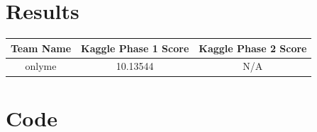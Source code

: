 \section{Results}

\begin{center}
 \begin{tabular}{|c | c | c |} 
 \hline
 Team Name & Kaggle Phase 1 Score & Kaggle Phase 2 Score  \\ [0.5ex]
 \hline\hline
onlyme & 10.13544 & N/A  \\
 \hline
\end{tabular}
\end{center}

\section{Code}


